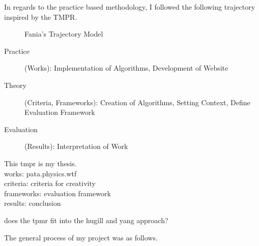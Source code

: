 \documentclass[11pt]{thesis} %
\begin{document}
In regards to the practice based methodology, I followed the following trajectory inspired by the \ac{TMPR}.


\begin{figure}[!htbp] %
  \centering
  \caption[Fania's Trajectory Model]{Fania's Trajectory Model}
\label{fig:ftmpr}
\end{figure}

\begin{description}
  \item [Practice] (Works): Implementation of Algorithms, Development of Website
  \item [Theory] (Criteria, Frameworks): Creation of Algorithms, Setting Context, Define Evaluation Framework
  \item [Evaluation] (Results): Interpretation of Work
\end{description}

\begin{draft}
  This tmpr is my thesis.\\
  works: pata.physics.wtf\\
  criteria: criteria for creativity\\
  frameworks: evaluation framework\\
  results: conclusion
\end{draft}

\begin{draft}
  does the tpmr fit into the hugill and yang approach?
\end{draft}



The general process of my project was as follows.
\end{document}
